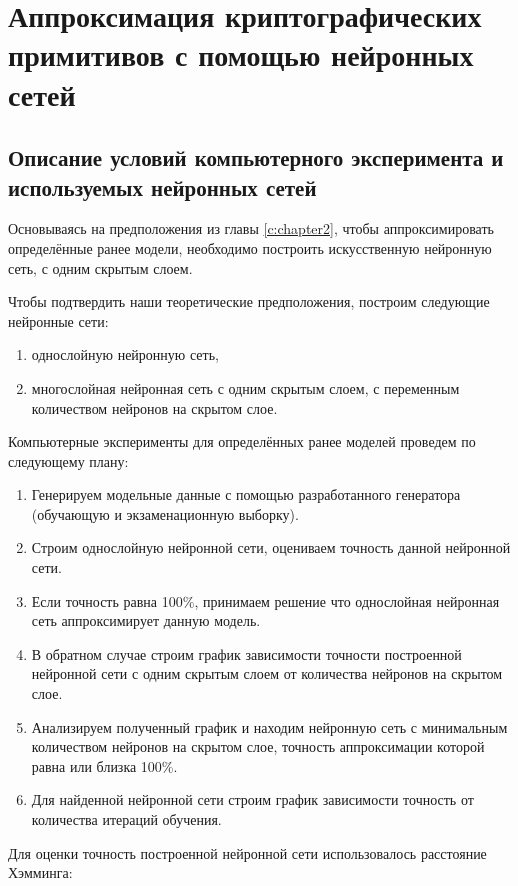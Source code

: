 \newpage

\section{Аппроксимация криптографических примитивов с помощью нейронных сетей}

\subsection{Описание условий компьютерного эксперимента и используемых нейронных сетей}
Основываясь на предположения из главы \ref{c:chapter2},
чтобы аппроксимировать определённые ранее модели, необходимо построить искусственную нейронную сеть, с одним скрытым слоем.
\bigskip

Чтобы подтвердить наши теоретические предположения, построим следующие нейронные сети:
\begin{enumerate}
	\item однослойную нейронную сеть,
	\item многослойная нейронная сеть с одним скрытым слоем, с переменным количеством нейронов на скрытом слое.
\end{enumerate}
\bigskip

Компьютерные эксперименты для определённых ранее моделей проведем по следующему плану:
\begin{enumerate}
	\item Генерируем модельные данные с помощью разработанного генератора (обучающую и экзаменационную выборку).
	\item Строим однослойную нейронной сети, оцениваем точность данной нейронной сети.
	\item Если точность равна 100\%, принимаем решение что однослойная нейронная сеть аппроксимирует данную модель.
	\item В обратном случае строим график зависимости точности построенной нейронной сети с одним скрытым слоем от количества нейронов на скрытом слое.
	\item Анализируем полученный график и находим нейронную сеть с минимальным количеством нейронов на скрытом слое, точность аппроксимации которой равна или близка 100\%.
	\item Для найденной нейронной сети строим график зависимости точность от количества итераций обучения.
\end{enumerate}

\bigskip
Для оценки точность построенной нейронной сети использовалось расстояние Хэмминга:

